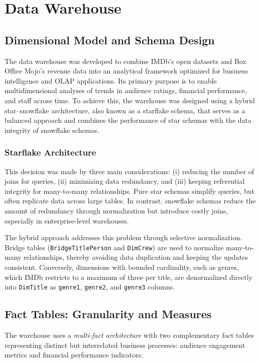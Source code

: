 \section{Data Warehouse}

\subsection{Dimensional Model and Schema Design}

The data warehouse was developed to combine IMDb’s open datasets and Box Office Mojo’s revenue data into an analytical framework optimized for business intelligence and OLAP applications. Its primary purpose is to enable multidimensional analyses of trends in audience ratings, financial performance, and staff across time. To achieve this, the warehouse was designed using a hybrid star–snowflake architecture, also known as a starflake schema, that serves as a balanced approach and combines the performance of star schemas with the data integrity of snowflake schemas.

\subsubsection{Starflake Architecture}

This decision was made by three main considerations: (i) reducing the number of joins for queries, (ii) minimizing data redundancy, and (iii) keeping referential integrity for many-to-many relationships. Pure star schemas simplify queries, but often replicate data across large tables. In contrast, snowflake schemas reduce the amount of redundancy through normalization but introduce costly joins, especially in enterprise-level warehouses.

The hybrid approach addresses this problem through selective normalization. Bridge tables (\verb|BridgeTitlePerson| and \verb|DimCrew|) are used to normalize many-to-many relationships, thereby avoiding data duplication and keeping the updates consistent. Conversely, dimensions with bounded cardinality, such as genres, which IMDb restricts to a maximum of three per title, are denormalized directly into \verb|DimTitle| as \verb|genre1|, \verb|genre2|, and \verb|genre3| columns.

\subsection{Fact Tables: Granularity and Measures}

The warehouse uses a \textit{multi-fact architecture} with two complementary fact tables representing distinct but interrelated business processes: audience engagement metrics and financial performance indicators.

